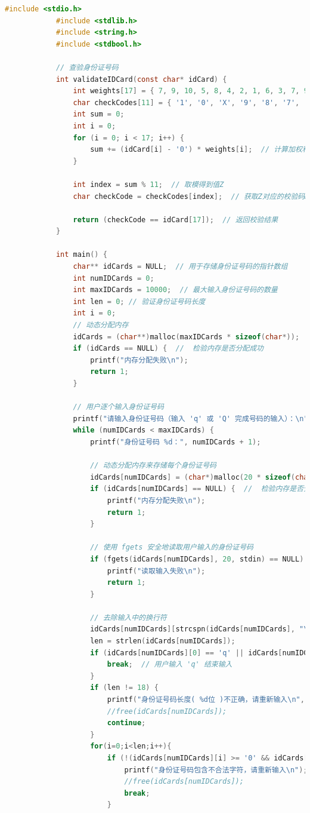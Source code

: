 \documentclass[withoutpreface,bwprint]{cumcmthesis}  %
\begin{document}
		\begin{lstlisting}[language=c]
			#include <stdio.h>
			#include <stdlib.h>
			#include <string.h>
			#include <stdbool.h>
			
			// 查验身份证号码
			int validateIDCard(const char* idCard) {
				int weights[17] = { 7, 9, 10, 5, 8, 4, 2, 1, 6, 3, 7, 9, 10, 5, 8, 4, 2 };  // 对身份证号码前17位数字求加权和的权重
				char checkCodes[11] = { '1', '0', 'X', '9', '8', '7', '6', '5', '4', '3', '2' };  // 校验码M的值
				int sum = 0;
				int i = 0;
				for (i = 0; i < 17; i++) {
					sum += (idCard[i] - '0') * weights[i];  // 计算加权和
				}
				
				int index = sum % 11;  // 取模得到值Z
				char checkCode = checkCodes[index];  // 获取Z对应的校验码M
				
				return (checkCode == idCard[17]);  // 返回校验结果
			}
			
			int main() {
				char** idCards = NULL;  // 用于存储身份证号码的指针数组
				int numIDCards = 0;
				int maxIDCards = 10000;  // 最大输入身份证号码的数量
				int len = 0; // 验证身份证号码长度
				int i = 0;
				// 动态分配内存
				idCards = (char**)malloc(maxIDCards * sizeof(char*));
				if (idCards == NULL) {  //  检验内存是否分配成功
					printf("内存分配失败\n");
					return 1;
				}
				
				// 用户逐个输入身份证号码
				printf("请输入身份证号码（输入 'q' 或 'Q' 完成号码的输入）：\n");
				while (numIDCards < maxIDCards) {
					printf("身份证号码 %d：", numIDCards + 1);
					
					// 动态分配内存来存储每个身份证号码
					idCards[numIDCards] = (char*)malloc(20 * sizeof(char));  // 身份证号码长度为18位，最后一位为'\0'
					if (idCards[numIDCards] == NULL) {  //  检验内存是否分配成功
						printf("内存分配失败\n");
						return 1;
					}
					
					// 使用 fgets 安全地读取用户输入的身份证号码
					if (fgets(idCards[numIDCards], 20, stdin) == NULL) {
						printf("读取输入失败\n");
						return 1;
					}
					
					// 去除输入中的换行符
					idCards[numIDCards][strcspn(idCards[numIDCards], "\n")] = '\0';
					len = strlen(idCards[numIDCards]);
					if (idCards[numIDCards][0] == 'q' || idCards[numIDCards][0] == 'Q') {
						break;  // 用户输入 'q' 结束输入
					}
					if (len != 18) {
						printf("身份证号码长度( %d位 )不正确，请重新输入\n", len);
						//free(idCards[numIDCards]);
						continue;
					}
					for(i=0;i<len;i++){
						if (!(idCards[numIDCards][i] >= '0' && idCards[numIDCards][i] <='9' || idCards[numIDCards][i] == 'X')) {
							printf("身份证号码包含不合法字符，请重新输入\n");
							//free(idCards[numIDCards]);
							break;
						}
						

\end{lstlisting}
\end{document}
